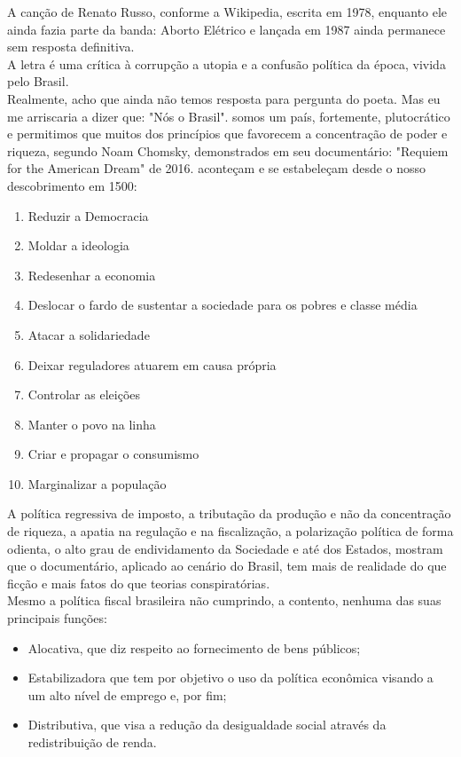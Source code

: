 \documentclass[12pt,a4paper]{article}
\begin{document}
\noindent
A canção de Renato Russo, conforme a Wikipedia, escrita em 1978, enquanto ele ainda fazia parte da banda: Aborto Elétrico e lançada em 1987 ainda permanece sem resposta definitiva.\\
A letra é uma crítica à corrupção a utopia e a confusão política da época, vivida pelo Brasil.\\
Realmente, acho que ainda não temos resposta para pergunta do poeta. Mas eu me arriscaria a dizer que: "Nós o Brasil". somos um país, fortemente, plutocrático e permitimos que muitos dos princípios que favorecem a concentração de poder e riqueza, segundo Noam Chomsky, demonstrados em seu documentário: "Requiem for the American Dream" de 2016.  aconteçam e se estabeleçam desde o nosso descobrimento em 1500:
\begin{enumerate}
\item Reduzir a Democracia
\item Moldar a ideologia
\item Redesenhar a economia
\item Deslocar o fardo de sustentar a sociedade para os pobres e classe média
\item Atacar a solidariedade
\item Deixar reguladores atuarem em causa própria
\item Controlar as eleições
\item Manter o povo na linha
\item Criar e propagar o consumismo
\item Marginalizar a população
\end{enumerate}
A política regressiva de imposto, a tributação da produção e não da concentração de riqueza, a apatia na regulação e na fiscalização, a polarização política de forma odienta, o alto grau de endividamento da Sociedade e até dos Estados, mostram que o documentário, aplicado ao cenário do Brasil, tem mais de realidade do que ficção e mais fatos do que teorias conspiratórias.\\
Mesmo a política fiscal brasileira não cumprindo, a contento, nenhuma das suas principais funções:
\begin{itemize}
\item Alocativa, que diz respeito ao fornecimento de bens públicos; 
\item Estabilizadora que tem por objetivo o uso da política econômica visando a um alto nível de emprego e, por fim;
\item Distributiva, que visa a redução da desigualdade social através da redistribuição de renda.
\end{itemize}
\end{document}
